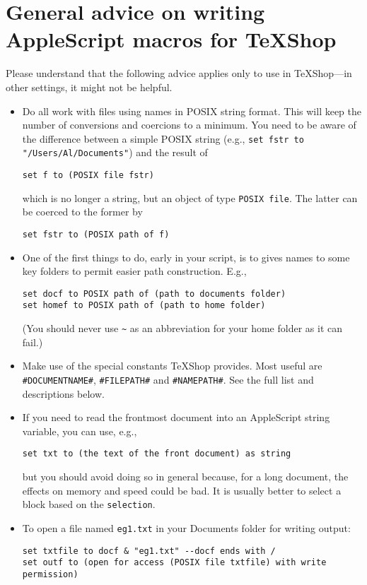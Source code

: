 \documentclass[11pt]{amsart}
\def\TeXShop{\TeX Shop\xspace}
\begin{document}
\section{General advice on writing AppleScript macros for \TeXShop}
Please understand that the following advice applies only to use in \TeXShop---in other settings, it might not be helpful.
\begin{itemize}
\item
Do all work with files using names in POSIX string format. This will keep the number of conversions and coercions to a minimum. You need to be aware of the difference between a simple POSIX string (e.g., \verb|set fstr to "/Users/Al/Documents"|) and the result of 
\begin{verbatim}
set f to (POSIX file fstr)
\end{verbatim} which is no longer a string, but an object of type {\tt POSIX file}. The latter can be coerced to the former by 
\begin{verbatim}
set fstr to (POSIX path of f)
\end{verbatim}
\item One of the first things to do, early in your script, is to gives names to some key folders to permit easier path construction. E.g.,
\begin{verbatim}
set docf to POSIX path of (path to documents folder)
set homef to POSIX path of (path to home folder)
\end{verbatim}
(You should never use \verb|~| as an abbreviation for your home folder as it can fail.)
\item Make use of the special constants \TeXShop provides. Most useful are \verb|#DOCUMENTNAME#|, \verb|#FILEPATH#| and \verb|#NAMEPATH#|. See the full list and descriptions  below.
\item If you need to read the frontmost document into an AppleScript string variable, you can use, e.g.,
\begin{verbatim}
set txt to (the text of the front document) as string
\end{verbatim}
but you should avoid doing so in general because, for a long document, the effects on memory and speed could be bad. It is usually better to select a block based on the {\tt selection}.
\item To open a file named {\tt eg1.txt} in your Documents folder for writing output:
\begin{verbatim}
set txtfile to docf & "eg1.txt" --docf ends with /
set outf to (open for access (POSIX file txtfile) with write permission)

\end{verbatim}
\end{itemize}
\end{document}
